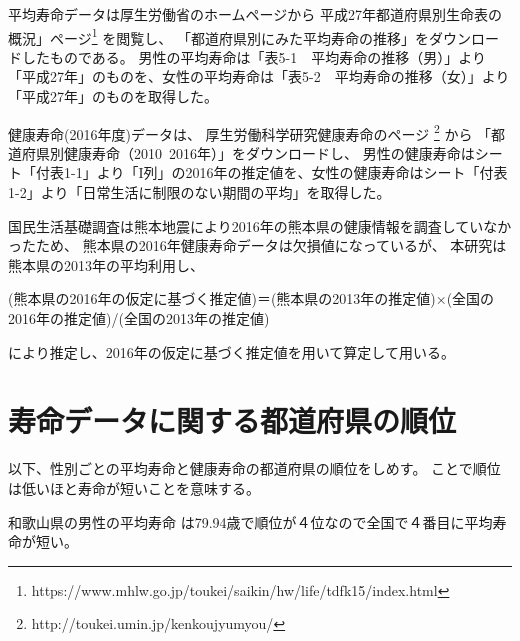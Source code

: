 平均寿命データは厚生労働省のホームページから
平成27年都道府県別生命表の概況」ページ\footnote{https://www.mhlw.go.jp/toukei/saikin/hw/life/tdfk15/index.html}
を閲覧し、
「都道府県別にみた平均寿命の推移」をダウンロードしたものである。
男性の平均寿命は「表5-1　平均寿命の推移（男）」より「平成27年」のものを、女性の平均寿命は「表5-2　平均寿命の推移（女）」より「平成27年」のものを取得した。


健康寿命(2016年度)データは、
厚生労働科学研究健康寿命のページ
\footnote{http://toukei.umin.jp/kenkoujyumyou/}
から
「都道府県別健康寿命（2010~2016年）」をダウンロードし、
男性の健康寿命はシート「付表1-1」より「I列」の2016年の推定値を、女性の健康寿命はシート「付表1-2」より「日常生活に制限のない期間の平均」を取得した。

国民生活基礎調査は熊本地震により2016年の熊本県の健康情報を調査していなかったため、
熊本県の2016年健康寿命データは欠損値になっているが、
本研究は熊本県の2013年の平均利用し、

\begin{center}
	(熊本県の2016年の仮定に基づく推定値)＝(熊本県の2013年の推定値)×(全国の2016年の推定値)/(全国の2013年の推定値)
\end{center}

により推定し、2016年の仮定に基づく推定値を用いて算定して用いる。




\newpage

\section{寿命データに関する都道府県の順位}

以下、性別ごとの平均寿命と健康寿命の都道府県の順位をしめす。
ことで順位は低いほと寿命が短いことを意味する。

和歌山県の男性の平均寿命
は79.94歳で順位が４位なので全国で４番目に平均寿命が短い。






